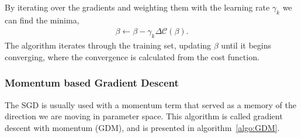 \documentclass[english,notitlepage,reprint,nofootinbib]{revtex4–2}  %
\begin{document}


By iterating over the gradients and weighting them with the learning rate $\gamma_k$ we can find the minima, 
\begin{align}
    \beta \leftarrow \beta - \gamma_k \Delta \mathcal{C}(\beta). 
\end{align}
The algorithm iterates through the training set, updating $\beta$ until it begins converging, where the convergence is calculated from the cost function. 

\subsubsection{Momentum based Gradient Descent}%
The SGD is usually used with a momentum term that served as a memory of the direction we are moving in parameter space. This algorithm is called gradient descent with momentum (GDM), and is presented in algorithm~\ref{algo:GDM}. 
\end{document}
